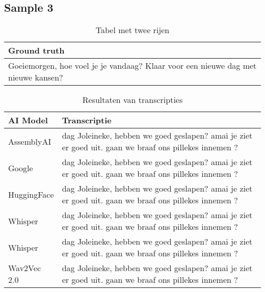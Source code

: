 \subsection{Sample 3}
\begin{table}[htbp]
    \centering
    \label{tab:groundtruth_sample3}
    \begin{tabularx}{\textwidth}{|X|}
        \hline
        \textbf{Ground truth} \\
        
        \hline
        Goeiemorgen, hoe voel je je vandaag? Klaar voor een nieuwe dag met nieuwe kansen? \\
        \hline
    \end{tabularx}
    \caption{Tabel met twee rijen}
\end{table}

\begin{table}[htbp]
    \centering
    \label{tab:results_sample3}
    \begin{tabularx}{\textwidth}{|l|X|}
        \hline
        \textbf{AI Model} & \textbf{Transcriptie} \\ \midrule
        
        AssemblyAI & dag Joleineke, hebben we goed geslapen? amai je ziet er goed uit. gaan we braaf ons pillekes innemen ? \\ \hline
        
        Google & dag Joleineke, hebben we goed geslapen? amai je ziet er goed uit. gaan we braaf ons pillekes innemen ? \\ \hline
        
        HuggingFace & dag Joleineke, hebben we goed geslapen? amai je ziet er goed uit. gaan we braaf ons pillekes innemen ? \\ \hline
        
        Whisper & dag Joleineke, hebben we goed geslapen? amai je ziet er goed uit. gaan we braaf ons pillekes innemen ? \\ \hline
        
        Whisper & dag Joleineke, hebben we goed geslapen? amai je ziet er goed uit. gaan we braaf ons pillekes innemen ? \\ \hline
        
        Wav2Vec 2.0 & dag Joleineke, hebben we goed geslapen? amai je ziet er goed uit. gaan we braaf ons pillekes innemen ? \\ \hline
    \end{tabularx}
    \caption{Resultaten van transcripties}
\end{table}
\FloatBarrier
